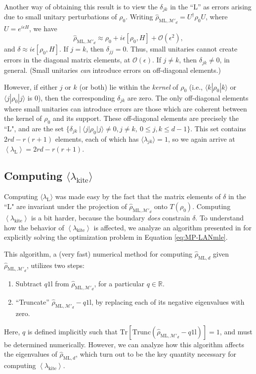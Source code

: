 \documentclass[aps,pra, twocolumn]{revtex4-1}
\newcommand{\M}{\mathcal{M}}
\newcommand{\Tr}{\mathrm{Tr}}
\newcommand{\Id}{\mathbb{I}}
\newcommand{\expect}[1]{\ensuremath{\left\langle#1\right\rangle}}
\def\Id{1\!\mathrm{l}}
\newcommand{\rhohat}{\hat{\rho}}
\newcommand{\rhoML}[1]{\rhohat_{\scriptscriptstyle{\mathrm{ML},#1}}}
\begin{document}
Another way of obtaining this result is to view the $\delta_{jk}$ in the ``L'' as errors arising due to small unitary perturbations of $\rho_{0}$. Writing $\rhoML{\M'_{d}} = U^{\dagger}\rho_{0}U$, where $U=e^{i\epsilon H}$, we have
\[\rhoML{\M'_{d}} \approx \rho_{0} + i\epsilon [\rho_{0},H]+\mathcal{O}(\epsilon^{2}),\]
and $\delta \approx i\epsilon [\rho_{0},H]$.
If $j = k$, then $\delta_{jj} = 0$. Thus, small unitaries cannot create errors in the diagonal matrix elements, at $\mathcal{O}(\epsilon)$. If $j \neq k$, then $\delta_{jk} \neq 0$, in general. (Small unitaries \emph{can} introduce errors on off-diagonal elements.)

However, if either $j$ or $k$ (or both) lie within the \emph{kernel} of $\rho_{0}$ (i.e., $\langle k | \rho_{0}| k \rangle$ or $\langle j|\rho_{0}|j\rangle$ is 0), then the corresponding $\delta_{jk}$ are zero. The only off-diagonal elements where small unitaries can introduce errors are those which are coherent between the kernel of $\rho_{0}$ and its support. These off-diagonal elements are precisely the ``L", and are  the set $\{\delta_{jk}~|~\langle j | \rho_{0}|j\rangle \neq 0, j\neq k, ~ 0 \leq j,k \leq d - 1\}$. This set contains $2rd - r(r+1)$ elements, each of which has $\langle \lambda_{jk}\rangle = 1$, so we again arrive at $\expect{\lambda_{\mathrm{L}}} = 2rd - r(r+1)$.

\subsection{Computing $\langle \lambda_\mathrm{kite}\rangle$}
\label{subsec:kite}
Computing $\langle \lambda_{\mathrm{L}}\rangle$ was made easy by the fact that the matrix elements of $\delta$ in the ``L" are invariant under the projection of $\rhoML{\M'_{d}}$ onto $T(\rho_{0})$. Computing $\expect{\lambda_{\mathrm{kite}}}$ is a bit harder, because the boundary \emph{does} constrain $\delta$. To understand how the behavior of $\expect{\lambda_{\mathrm{kite}}}$ is affected, we analyze an algorithm presented in \cite{Smolin2012} for explicitly solving the optimization problem in Equation \eqref{eq:MP-LANmle}.

This algorithm, a (very fast) numerical method for computing $\rhoML{d}$ given $\rhoML{\M'_{d}}$, utilizes two steps:
\begin{enumerate}[noitemsep]
\item Subtract $q\Id$ from $\rhoML{\M'_{d}}$, for a particular $q \in \mathbb{R}$.
\item ``Truncate'' $\rhoML{\M'_{d}}-q\Id$, by replacing each of its negative eigenvalues with zero.
\end{enumerate}
Here, $q$ is defined implicitly such that $\Tr\left[ \mathrm{Trunc}(\rhoML{\M'_{d}}-q\Id)\right] = 1$, and must be determined numerically.
However, we can analyze how this algorithm affects the eigenvalues of $\rhoML{d}$, which turn out to be the key quantity necessary for computing $\expect{\lambda_{\mathrm{kite}}}$.
\end{document}
